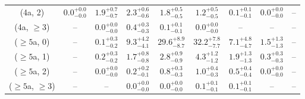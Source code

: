 \begin{table}[h!]
{\begin{tabular}{ccccccccc}
	(4a, 2) & $0.0^{+ 0.0 }_{- 0.0 }$ & $1.9^{+ 0.7 }_{- 0.7 }$ & $2.3^{+ 0.6 }_{- 0.6 }$ & $1.8^{+ 0.5 }_{- 0.5 }$ & $1.2^{+ 0.5 }_{- 0.5 }$ & $0.1^{+ 0.1 }_{- 0.1 }$ & $0.0^{+ 0.0 }_{- 0.0 }$ & -- \\[0.5ex] 
	(4a, $\ge3$) & -- & $0.0^{+ 0.0 }_{- 0.0 }$ & $0.4^{+ 0.3 }_{- 0.3 }$ & $0.1^{+ 0.1 }_{- 0.1 }$ & $0.0^{+ 0.0 }_{- 0.0 }$ & -- & -- & -- \\[0.5ex] 
	($\ge5$a, 0) & -- & $0.1^{+ 0.3 }_{- 0.2 }$ & $9.3^{+ 4.2 }_{- 4.1 }$ & $29.6^{+ 8.9 }_{- 8.7 }$ & $32.2^{+ 7.8 }_{- 7.7 }$ & $7.1^{+ 4.8 }_{- 4.7 }$ & $1.5^{+ 1.3 }_{- 1.3 }$ & -- \\[0.5ex] 
	($\ge5$a, 1) & -- & $0.2^{+ 0.3 }_{- 0.2 }$ & $1.7^{+ 0.8 }_{- 0.8 }$ & $2.8^{+ 0.9 }_{- 0.9 }$ & $4.3^{+ 1.2 }_{- 1.2 }$ & $1.9^{+ 1.3 }_{- 1.3 }$ & $0.3^{+ 0.3 }_{- 0.3 }$ & -- \\[0.5ex] 
	($\ge5$a, 2) & -- & $0.0^{+ 0.0 }_{- 0.0 }$ & $0.2^{+ 0.2 }_{- 0.1 }$ & $0.8^{+ 0.3 }_{- 0.3 }$ & $1.0^{+ 0.4 }_{- 0.3 }$ & $0.5^{+ 0.4 }_{- 0.4 }$ & $0.0^{+ 0.0 }_{- 0.0 }$ & -- \\[0.5ex] 
	($\ge5$a, $\ge3$) & -- & -- & $0.0^{+ 0.0 }_{- 0.0 }$ & $0.0^{+ 0.0 }_{- 0.0 }$ & $0.1^{+ 0.1 }_{- 0.1 }$ & $0.1^{+ 0.1 }_{- 0.1 }$ & -- & -- \\[0.5ex] 
	\hline
	\hline
\end{tabular}}
\end{table}
